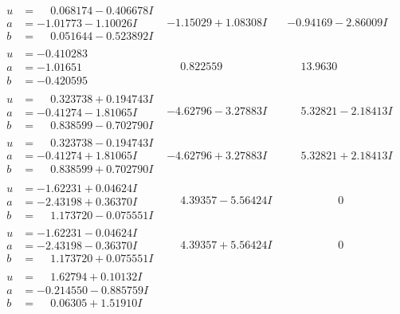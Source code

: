 \documentclass[1p]{elsarticle_modified}
\theoremstyle{definition}
\begin{document}
$$\begin{array}{c|c|c}
\begin{aligned}
u &= \phantom{-}0.068174 - 0.406678 I \\
a &= -1.01773 - 1.10026 I \\
b &= \phantom{-}0.051644 - 0.523892 I\end{aligned}
 & -1.15029 + 1.08308 I & -0.94169 - 2.86009 I \\ \hline\begin{aligned}
u &= -0.410283\phantom{ +0.000000I} \\
a &= -1.01651\phantom{ +0.000000I} \\
b &= -0.420595\phantom{ +0.000000I}\end{aligned}
 & \phantom{-}0.822559\phantom{ +0.000000I} & \phantom{-}13.9630\phantom{ +0.000000I} \\ \hline\begin{aligned}
u &= \phantom{-}0.323738 + 0.194743 I \\
a &= -0.41274 - 1.81065 I \\
b &= \phantom{-}0.838599 - 0.702790 I\end{aligned}
 & -4.62796 - 3.27883 I & \phantom{-}5.32821 - 2.18413 I \\ \hline\begin{aligned}
u &= \phantom{-}0.323738 - 0.194743 I \\
a &= -0.41274 + 1.81065 I \\
b &= \phantom{-}0.838599 + 0.702790 I\end{aligned}
 & -4.62796 + 3.27883 I & \phantom{-}5.32821 + 2.18413 I \\ \hline\begin{aligned}
u &= -1.62231 + 0.04624 I \\
a &= -2.43198 + 0.36370 I \\
b &= \phantom{-}1.173720 - 0.075551 I\end{aligned}
 & \phantom{-}4.39357 - 5.56424 I & \phantom{-0.000000 } 0 \\ \hline\begin{aligned}
u &= -1.62231 - 0.04624 I \\
a &= -2.43198 - 0.36370 I \\
b &= \phantom{-}1.173720 + 0.075551 I\end{aligned}
 & \phantom{-}4.39357 + 5.56424 I & \phantom{-0.000000 } 0 \\ \hline\begin{aligned}
u &= \phantom{-}1.62794 + 0.10132 I \\
a &= -0.214550 - 0.885759 I \\
b &= \phantom{-}0.06305 + 1.51910 I\end{aligned}

\end{array}$$
\end{document}
